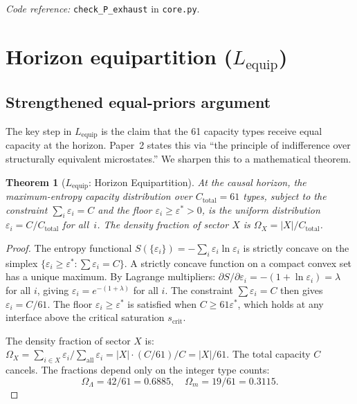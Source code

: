 \documentclass[11pt,a4paper]{article}
\newtheorem{theorem}{Theorem}[section]
\theoremstyle{definition}
\newcommand{\eps}{\varepsilon}
\newcommand{\coderef}[2]{\smallskip\noindent\textit{Code reference:} \texttt{#1} in \texttt{#2}.}
\begin{document}
\coderef{check\_P\_exhaust}{core.py}


\section{Horizon equipartition ($L_{\mathrm{equip}}$)}
\label{sec:equip}


\subsection{Strengthened equal-priors argument}
\label{sec:equal_priors}

The key step in $L_{\mathrm{equip}}$ is the claim that the 61 capacity
types receive equal capacity at the horizon.  Paper~2 states this via
``the principle of indifference over structurally equivalent microstates.''
We sharpen this to a mathematical theorem.

\begin{theorem}[$L_{\mathrm{equip}}$: Horizon Equipartition]\label{thm:Lequip}
At the causal horizon, the maximum-entropy capacity distribution over
$C_{\mathrm{total}} = 61$ types, subject to the constraint
$\sum_i \eps_i = C$ and the floor $\eps_i \ge \eps^* > 0$, is the
uniform distribution $\eps_i = C / C_{\mathrm{total}}$ for all~$i$.
The density fraction of sector $X$ is
$\Omega_X = |X| / C_{\mathrm{total}}$.
\end{theorem}

\begin{proof}
The entropy functional $S(\{\eps_i\}) = -\sum_i \eps_i \ln \eps_i$
is strictly concave on the simplex
$\{\eps_i \ge \eps^* : \sum \eps_i = C\}$.  A strictly concave function
on a compact convex set has a unique maximum.  By Lagrange multipliers:
$\partial S / \partial \eps_i = -(1 + \ln \eps_i) = \lambda$ for all
$i$, giving $\eps_i = e^{-(1+\lambda)}$ for all $i$.  The constraint
$\sum \eps_i = C$ then gives $\eps_i = C / 61$.  The floor
$\eps_i \ge \eps^*$ is satisfied when $C \ge 61 \eps^*$, which holds
at any interface above the critical saturation $s_{\mathrm{crit}}$.

The density fraction of sector $X$ is:
$\Omega_X = \sum_{i \in X} \eps_i / \sum_{\mathrm{all}} \eps_i
= |X| \cdot (C/61) / C = |X|/61$.
The total capacity $C$ cancels.  The fractions depend only on the
integer type counts:
\[
  \Omega_\Lambda = 42/61 = 0.6885, \quad
  \Omega_m = 19/61 = 0.3115.
\]
\end{proof}
\end{document}
